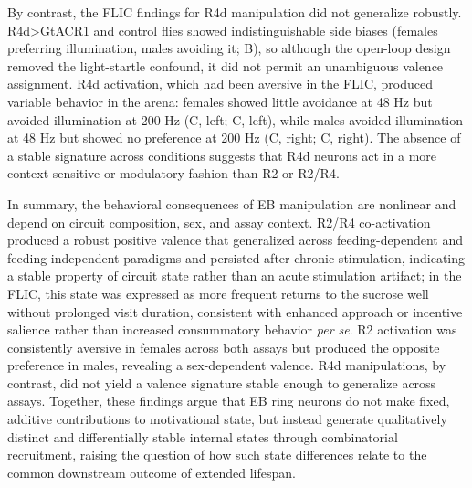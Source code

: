 By contrast, the FLIC findings for R4d manipulation did not generalize robustly. 
R4d>GtACR1 and control flies showed indistinguishable side biases (females preferring illumination, males avoiding it; B), so although the open-loop design removed the light-startle confound, it did not permit an unambiguous valence assignment. 
R4d activation, which had been aversive in the FLIC, produced variable behavior in the arena: females showed little avoidance at 48 Hz but avoided illumination at 200 Hz (C, left; C, left), while males avoided illumination at 48 Hz but showed no preference at 200 Hz (C, right; C, right).
The absence of a stable signature across conditions suggests that R4d neurons act in a more context-sensitive or modulatory fashion than R2 or R2/R4.

In summary, the behavioral consequences of EB manipulation are nonlinear and depend on circuit composition, sex, and assay context. 
R2/R4 co-activation produced a robust positive valence that generalized across feeding-dependent and feeding-independent paradigms and persisted after chronic stimulation, indicating a stable property of circuit state rather than an acute stimulation artifact; in the FLIC, this state was expressed as more frequent returns to the sucrose well without prolonged visit duration, consistent with enhanced approach or incentive salience rather than increased consummatory behavior \textit{per se}. 
R2 activation was consistently aversive in females across both assays but produced the opposite preference in males, revealing a sex-dependent valence. 
R4d manipulations, by contrast, did not yield a valence signature stable enough to generalize across assays. 
Together, these findings argue that EB ring neurons do not make fixed, additive contributions to motivational state, but instead generate qualitatively distinct and differentially stable internal states through combinatorial recruitment, raising the question of how such state differences relate to the common downstream outcome of extended lifespan.

